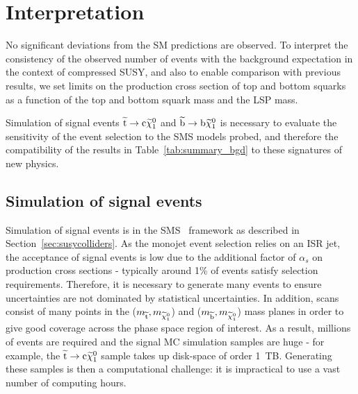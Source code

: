 %
\section{Interpretation} 
\label{sec:GEN}

No significant deviations from the \ac{SM} predictions are observed. 
To interpret the consistency of the observed number of events with
the background expectation in the context of compressed \ac{SUSY}, and also to
enable comparison with previous results, we set limits on the production cross section of top and bottom squarks as a function of the top and bottom squark mass and the LSP mass. 

Simulation of signal events 
$\widetilde{{\rm t}}\rightarrow{\rm c}\widetilde{\chi}^{0}_{1}$ and 
$\widetilde{{\rm b}}\rightarrow{\rm b}\widetilde{\chi}^{0}_{1}$ is necessary to evaluate the sensitivity of the event selection to the \ac{SMS} models probed, and therefore the compatibility of the results in Table~\ref{tab:summary_bgd} to these signatures of new physics.

\subsection{Simulation of signal events}

Simulation of signal events is in the \ac{SMS}~\cite{bib:SMS} framework as described in Section~\ref{sec:susycolliders}. 
As the monojet event selection relies on an \ac{ISR} jet, the acceptance of signal events is low due to the additional factor of $\alpha_s$ on production cross sections - typically around 1\% of events satisfy selection requirements. 
Therefore, it is necessary to generate many events to ensure uncertainties are not dominated by statistical uncertainties. 
In addition, scans consist of many points in the ($m_{\widetilde{{\rm t}}}, m_{\widetilde{\chi}^{0}_{1}}$) and ($m_{\widetilde{{\rm b}}}, m_{\widetilde{\chi}^{0}_{1}}$) mass planes in order to give good coverage across the phase space region of interest. 
As a result, millions of events are required and the signal MC simulation samples are huge - for example, the $\widetilde{{\rm t}} \rightarrow {\rm c} \widetilde{\chi}^{0}_{1}$ sample takes up disk-space of order 1~TB.
Generating these samples is then a computational challenge: 
it is impractical to use a vast number of computing hours. 

